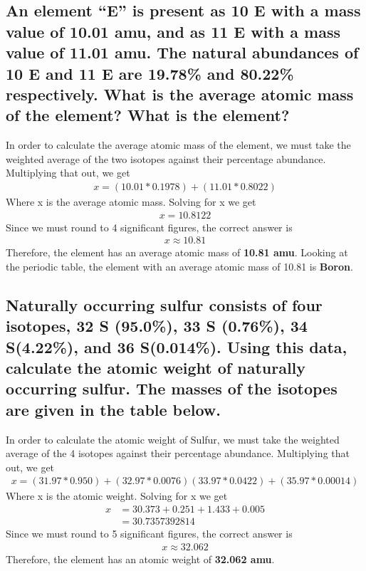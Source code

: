 \documentclass[11pt]{article}
\begin{document}
\subsection{An element “E” is present as 10 E with a mass value of 10.01 amu, and as 11 E with a mass value of 11.01 amu. The natural abundances of 10 E and 11 E are 19.78\% and 80.22\% respectively. What is the average atomic mass of the element? What is the element?}
\label{sec:org699c2f4}
In order to calculate the average atomic mass of the element, we must take the weighted average of the two isotopes against their percentage abundance. Multiplying that out, we get
\begin{align*}
x=(10.01*0.1978)+(11.01*0.8022)
\end{align*}
Where x is the average atomic mass. Solving for x we get
\begin{align*}
x=10.8122
\end{align*}
Since we must round to 4 significant figures, the correct answer is
\begin{align*}
x\approx10.81
\end{align*}
Therefore, the element has an average atomic mass of \textbf{10.81 amu}. Looking at the periodic table, the element with an average atomic mass of 10.81 is \textbf{Boron}.

\subsection{Naturally occurring sulfur consists of four isotopes, 32 S (95.0\%), 33 S (0.76\%), 34 S(4.22\%), and 36 S(0.014\%). Using this data, calculate the atomic weight of naturally occurring sulfur. The masses of the isotopes are given in the table below.}
\label{sec:org76d1f71}
In order to calculate the atomic weight of Sulfur, we must take the weighted average of the 4 isotopes against their percentage abundance. Multiplying that out, we get
\begin{align*}
x=(31.97*0.950)+(32.97*0.0076)(33.97*0.0422)+(35.97*0.00014)
\end{align*}
Where x is the atomic weight. Solving for x we get
\begin{align*}
x&=30.373 + 0.251 + 1.433 + 0.005\\
&=30.7357392814
\end{align*}
Since we must round to 5 significant figures, the correct answer is
\begin{align*}
x\approx32.062
\end{align*}
Therefore, the element has an atomic weight of \textbf{32.062 amu}.
\end{document}
